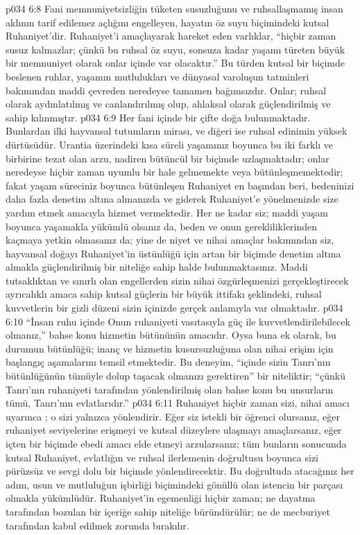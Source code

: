 \vs p034 6:8 Fani memnuniyetsizliğin tüketen susuzluğunu ve ruhsallaşmamış insan aklının tarif edilemez açlığını engelleyen, hayatın öz suyu biçimindeki kutsal Ruhaniyet’dir. Ruhaniyet’i amaçlayarak hareket eden varlıklar, “hiçbir zaman susuz kalmazlar; çünkü bu ruhsal öz suyu, sonsuza kadar yaşamı türeten büyük bir memnuniyet olarak onlar içinde var olacaktır.” Bu türden kutsal bir biçimde beslenen ruhlar, yaşamın mutlulukları ve dünyasal varoluşun tatminleri bakımından maddi çevreden neredeyse tamamen bağımsızdır. Onlar; ruhsal olarak aydınlatılmış ve canlandırılmış olup, ahlaksal olarak güçlendirilmiş ve sahip kılınmıştır.
\vs p034 6:9 Her fani içinde bir çifte doğa bulunmaktadır. Bunlardan ilki hayvansal tutumların mirası, ve diğeri ise ruhsal edinimin yüksek dürtüsüdür. Urantia üzerindeki kısa süreli yaşamınız boyunca bu iki farklı ve birbirine tezat olan arzu, nadiren bütüncül bir biçimde uzlaşmaktadır; onlar neredeyse hiçbir zaman uyumlu bir hale gelmemekte veya bütünleşmemektedir; fakat yaşam süreciniz boyunca bütünleşen Ruhaniyet en başından beri, bedeninizi daha fazla denetim altına almanızda ve giderek Ruhaniyet’e yönelmenizde size yardım etmek amacıyla hizmet vermektedir. Her ne kadar siz; maddi yaşam boyunca yaşamakla yükümlü olsanız da, beden ve onun gerekliliklerinden kaçmaya yetkin olmasanız da; yine de niyet ve nihai amaçlar bakımından siz, hayvansal doğayı Ruhaniyet’in üstünlüğü için artan bir biçimde denetim altına almakla güçlendirilmiş bir niteliğe sahip halde bulunmaktasınız. Maddi tutsaklıktan ve sınırlı olan engellerden sizin nihai özgürleşmenizi gerçekleştirecek ayrıcalıklı amaca sahip kutsal güçlerin bir büyük ittifakı şeklindeki, ruhsal kuvvetlerin bir gizli düzeni sizin içinizde gerçek anlamıyla var olmaktadır.
\vs p034 6:10 “İnsan ruhu içinde Onun ruhaniyeti vasıtasıyla güç ile kuvvetlendirilebilecek olmanız,” bahse konu hizmetin bütününün amacıdır. Oysa buna ek olarak, bu durumun bütünlüğü; inanç ve hizmetin kusursuzluğuna olan nihai erişim için başlangıç aşamalarını temsil etmektedir. Bu deneyim, “içinde sizin Tanrı’nın bütünlüğünün tümüyle dolup taşacak olmanızı gerektiren” bir niteliktir; “çünkü Tanrı’nın ruhaniyeti tarafından yönlendirilmiş olan bahse konu bu unsurların tümü, Tanrı’nın evlatlarıdır.”
\vs p034 6:11 Ruhaniyet hiçbir zaman sizi, nihai amacı uyarınca ; o sizi yalnızca yönlendirir. Eğer siz istekli bir öğrenci olursanız, eğer ruhaniyet seviyelerine erişmeyi ve kutsal düzeylere ulaşmayı amaçlarsanız, eğer içten bir biçimde ebedi amacı elde etmeyi arzularsanız; tüm bunların sonucunda kutsal Ruhaniyet, evlatlığın ve ruhsal ilerlemenin doğrultusu boyunca sizi pürüzsüz ve sevgi dolu bir biçimde yönlendirecektir. Bu doğrultuda atacağınız her adım, usun ve mutluluğun işbirliği biçimindeki gönüllü olan istencin bir parçası olmakla yükümlüdür. Ruhaniyet’in egemenliği hiçbir zaman; ne dayatma tarafından bozulan bir içeriğe sahip niteliğe büründürülür; ne de mecburiyet tarafından kabul edilmek zorunda bırakılır.

